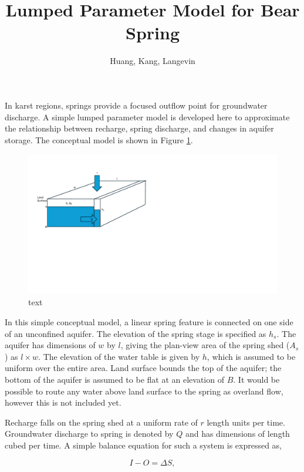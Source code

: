 \documentclass[11pt]{amsart}
\title{Lumped Parameter Model for Bear Spring}
\author{Huang, Kang, Langevin}
\begin{document}
\maketitle

In karst regions, springs provide a focused outflow point for groundwater discharge.  A simple lumped parameter model is developed here to approximate the relationship between recharge, spring discharge, and changes in aquifer storage.  The conceptual model is shown in Figure \ref{fig:concept}.    

\begin{figure}[!ht]
	\begin{center}
	\includegraphics[width=1.0\textwidth]{./concept.pdf}
	\caption[capt]{text}
	\label{fig:concept}
	\end{center}
\end{figure}

In this simple conceptual model, a linear spring feature is connected on one side of an unconfined aquifer. The elevation of the spring stage is specified as $h_s$.  The aquifer has dimensions of $w$ by $l$, giving the plan-view area of the spring shed ($A_s$) as $l \times w$.  The elevation of the water table is given by $h$, which is assumed to be uniform over the entire area.  Land surface bounds the top of the aquifer; the bottom of the aquifer is assumed to be flat at an elevation of $B$.  It would be possible to route any water above land surface to the spring as overland flow, however this is not included yet.

Recharge falls on the spring shed at a uniform rate of $r$ length units per time.  Groundwater discharge to spring is denoted by $Q$ and has dimensions of length cubed per time.  A simple balance equation for such a system is expressed as, 

\begin{equation}
I - O = \Delta S,
\end{equation}
\end{document}
